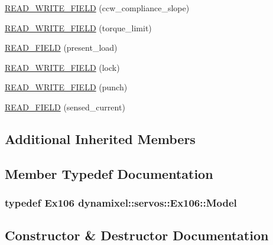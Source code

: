 \begin{DoxyCompactItemize}
\hyperlink{classdynamixel_1_1servos_1_1_ex106_ae4ef846b3e304abc918d5e0e79e0c11a}{R\+E\+A\+D\+\_\+\+W\+R\+I\+T\+E\+\_\+\+F\+I\+E\+L\+D} (ccw\+\_\+compliance\+\_\+slope)
\item 
\hyperlink{classdynamixel_1_1servos_1_1_ex106_a59dcbcd17fc92e2eda43ca8e7201eec2}{R\+E\+A\+D\+\_\+\+W\+R\+I\+T\+E\+\_\+\+F\+I\+E\+L\+D} (torque\+\_\+limit)
\item 
\hyperlink{classdynamixel_1_1servos_1_1_ex106_a67f5a8707a0e79f579a3f24ac7f0f7a7}{R\+E\+A\+D\+\_\+\+F\+I\+E\+L\+D} (present\+\_\+load)
\item 
\hyperlink{classdynamixel_1_1servos_1_1_ex106_a128e525aa4561eceb3e725d195042005}{R\+E\+A\+D\+\_\+\+W\+R\+I\+T\+E\+\_\+\+F\+I\+E\+L\+D} (lock)
\item 
\hyperlink{classdynamixel_1_1servos_1_1_ex106_ac6869c7fa60029e59e72b58034996738}{R\+E\+A\+D\+\_\+\+W\+R\+I\+T\+E\+\_\+\+F\+I\+E\+L\+D} (punch)
\item 
\hyperlink{classdynamixel_1_1servos_1_1_ex106_a3390822cf9fa0d09df2207f92a5a1d0d}{R\+E\+A\+D\+\_\+\+F\+I\+E\+L\+D} (sensed\+\_\+current)
\end{DoxyCompactItemize}
\subsection*{Additional Inherited Members}


\subsection{Member Typedef Documentation}
\hypertarget{classdynamixel_1_1servos_1_1_ex106_a82a4328e82ded805df0615ea61fc2458}{}
\subsubsection[{Model}]{\setlength{\rightskip}{0pt plus 5cm}typedef {\bf Ex106} {\bf dynamixel\+::servos\+::\+Ex106\+::\+Model}}\label{classdynamixel_1_1servos_1_1_ex106_a82a4328e82ded805df0615ea61fc2458}


\subsection{Constructor \& Destructor Documentation}
\hypertarget{classdynamixel_1_1servos_1_1_ex106_a5cb026fbd80322f319f7a9a6c27f4ecb}{}
